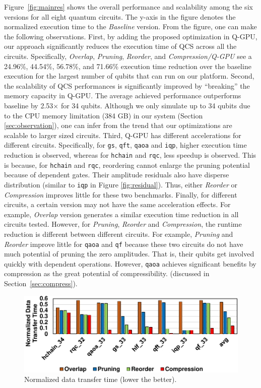 Figure~\ref{fig:mainres} shows the overall performance and scalability among the six versions for all eight quantum circuits. The y-axis in the figure denotes the normalized execution time to the {\it Baseline} version. From the figure, one can make the following observations. 
First, by adding the proposed optimization in Q-GPU, our approach significantly reduces the execution time of QCS  across all the circuits. 
Specifically, {\it Overlap}, {\it Pruning}, {\it Reorder}, and {\it Compression/Q-GPU} see a 24.96\%, 44.54\%, 56.78\%, and 71.66\% execution time reduction over the baseline execution for the largest number of qubits that can run on our platform. 
Second, the scalability of QCS performances is significantly improved by ``breaking'' the memory capacity in Q-GPU. 
The average achieved performance outperforms baseline by 2.53$\times$ for 34 qubits. Although we only simulate up to 34 qubits due to the CPU memory limitation (384 GB) in our system (Section \ref{sec:observation}), one can infer from the trend that our optimizations are scalable to larger sized circuits.
Third, Q-GPU has different accelerations for different circuits. Specifically, for {\tt gs}, {\tt qft}, {\tt qaoa} and {\tt iqp}, higher execution time reduction is observed, whereas for {\tt hchain} and {\tt rqc}, less speedup is observed. 
This is because, for {\tt hchain} and {\tt rqc}, reordering cannot enlarge the pruning potential because of dependent gates. Their amplitude residuals also have disperse distribution (similar to {\tt iqp} in Figure \ref{fig:residual}). Thus, either \emph{Reorder} or \emph{Compression} improves little for these two benchmarks. 
Finally, for different circuits, a certain version may not have the same acceleration effects. For example, {\it Overlap} version generates a similar execution time reduction in all circuits tested. 
However, for {\it Pruning}, {\it Reorder} and {\it Compression}, the runtime reduction is different between different circuits. For example, {\it Pruning} and {\it Reorder} improve little for {\tt qaoa} and {\tt qf} because these two circuits do not have much potential of pruning the zero amplitudes. 
That is, their qubits get involved quickly with dependent operations. However, {\tt qaoa} achieves significant benefits by compression as the great potential of compressibility. (discussed in Section~\ref{sec:compress}).


\begin{figure}[t!]
    \centering
    \includegraphics[width=\textwidth]{Images/appendix2/section-5/data-mov-red.pdf}
    \caption{Normalized data transfer time (lower the better).}
    \label{fig:data-mov-red}
    \vspace{-5pt}
\end{figure}


